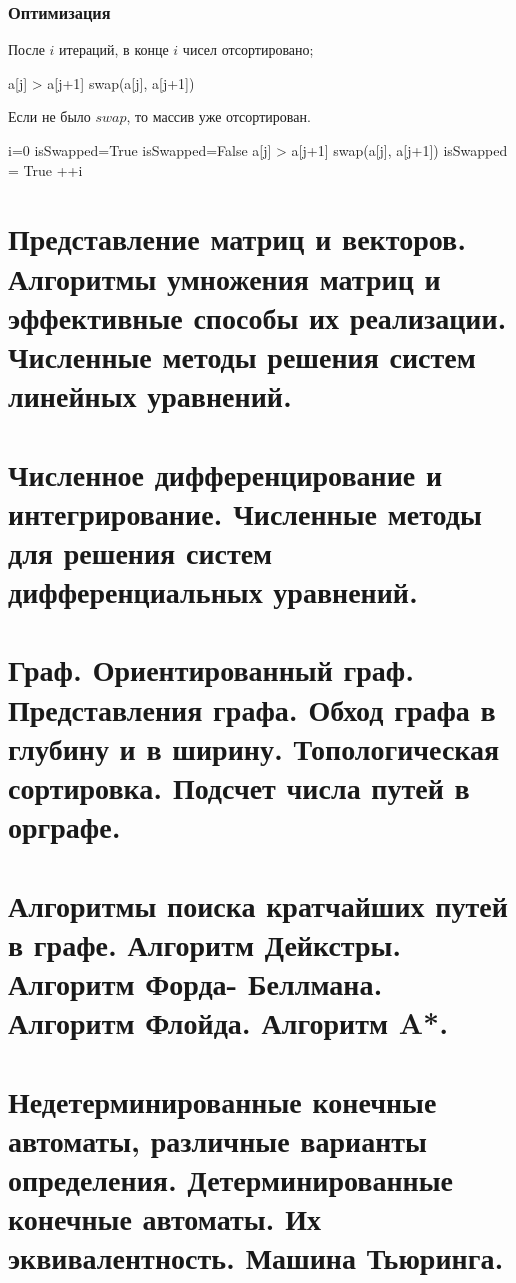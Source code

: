 \begin{multicols}{2}
    \subsubsection*{Оптимизация}
    \begin{enumerate*}
        \item После $i$ итераций, в конце $i$ чисел отсортировано;
        \begin{algorithmic}[1]
            \If a[j] > a[j+1]
            \State swap(a[j], a[j+1])
            \EndIf
            \EndFor
            \EndFor
            \EndFunction
        \end{algorithmic}
        \item Если не было $swap$, то массив уже отсортирован.
        \begin{algorithmic}[1]
            \State i=0
            \State isSwapped=True
            \State isSwapped=False
            \If a[j] > a[j+1]
            \State swap(a[j], a[j+1])
            \State isSwapped = True
            \EndIf
            \EndFor
            \State ++i
            \EndWhile
            \EndFunction
        \end{algorithmic}
    \end{enumerate*}

    \section{Представление матриц и векторов. Алгоритмы умножения матриц и эффективные
    способы их реализации. Численные методы решения систем линейных уравнений.}

    \section{Численное дифференцирование и интегрирование. Численные методы для решения
    систем дифференциальных уравнений.}

    \section{Граф. Ориентированный граф. Представления графа. Обход графа в глубину и в ширину.
    Топологическая сортировка. Подсчет числа путей в орграфе.}

    \section{Алгоритмы поиска кратчайших путей в графе. Алгоритм Дейкстры. Алгоритм Форда-
    Беллмана. Алгоритм Флойда. Алгоритм A*.}
    \columnbreak
    \section{Недетерминированные конечные автоматы, различные варианты определения.
    Детерминированные конечные автоматы. Их эквивалентность. Машина Тьюринга.}
\end{multicols}